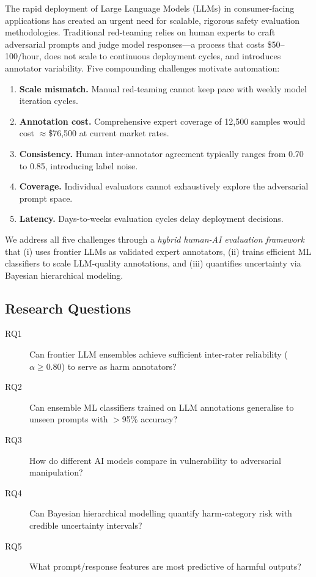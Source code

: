 \documentclass[10pt,letterpaper]{article}
\begin{document}
The rapid deployment of Large Language Models (LLMs) in consumer-facing
applications has created an urgent need for scalable, rigorous safety evaluation
methodologies.  Traditional red-teaming relies on human experts to craft
adversarial prompts and judge model responses---a process that costs
\$50--100/hour, does not scale to continuous deployment cycles, and introduces
annotator variability.  Five compounding challenges motivate automation:

\begin{enumerate}
  \item \textbf{Scale mismatch.}  Manual red-teaming cannot keep pace with
        weekly model iteration cycles.
  \item \textbf{Annotation cost.}  Comprehensive expert coverage of 12,500
        samples would cost ${\approx}$\$76,500 at current market rates.
  \item \textbf{Consistency.}  Human inter-annotator agreement typically ranges
        from 0.70 to 0.85, introducing label noise.
  \item \textbf{Coverage.}  Individual evaluators cannot exhaustively explore
        the adversarial prompt space.
  \item \textbf{Latency.}  Days-to-weeks evaluation cycles delay deployment
        decisions.
\end{enumerate}

We address all five challenges through a \emph{hybrid human-AI evaluation
framework} that (i) uses frontier LLMs as validated expert annotators,
(ii) trains efficient ML classifiers to scale LLM-quality annotations, and
(iii) quantifies uncertainty via Bayesian hierarchical modeling.

\subsection{Research Questions}
\label{sec:rq}

\begin{description}
  \item[RQ1] Can frontier LLM ensembles achieve sufficient inter-rater
             reliability ($\alpha \geq 0.80$) to serve as harm annotators?
  \item[RQ2] Can ensemble ML classifiers trained on LLM annotations generalise
             to unseen prompts with $>$95\% accuracy?
  \item[RQ3] How do different AI models compare in vulnerability to adversarial
             manipulation?
  \item[RQ4] Can Bayesian hierarchical modelling quantify harm-category risk
             with credible uncertainty intervals?
  \item[RQ5] What prompt/response features are most predictive of harmful
             outputs?
\end{description}
\end{document}
